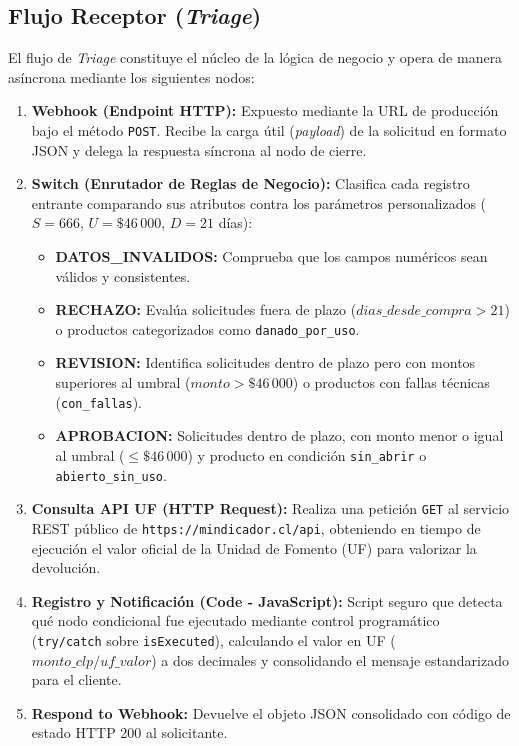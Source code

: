 \documentclass[11pt,letterpaper]{article}
\begin{document}
\subsection{Flujo Receptor (\textit{Triage})}
El flujo de \textit{Triage} constituye el núcleo de la lógica de negocio y opera de manera asíncrona mediante los siguientes nodos:
\begin{enumerate}
    \item \textbf{Webhook (Endpoint HTTP):} Expuesto mediante la URL de producción bajo el método \texttt{POST}. Recibe la carga útil (\textit{payload}) de la solicitud en formato JSON y delega la respuesta síncrona al nodo de cierre.
    \item \textbf{Switch (Enrutador de Reglas de Negocio):} Clasifica cada registro entrante comparando sus atributos contra los parámetros personalizados ($S = 666$, $U = \$46\,000$, $D = 21$ días):
    \begin{itemize}
        \item \textbf{DATOS\_INVALIDOS:} Comprueba que los campos numéricos sean válidos y consistentes.
        \item \textbf{RECHAZO:} Evalúa solicitudes fuera de plazo ($dias\_desde\_compra > 21$) o productos categorizados como \texttt{danado\_por\_uso}.
        \item \textbf{REVISION:} Identifica solicitudes dentro de plazo pero con montos superiores al umbral ($monto > \$46\,000$) o productos con fallas técnicas (\texttt{con\_fallas}).
        \item \textbf{APROBACION:} Solicitudes dentro de plazo, con monto menor o igual al umbral ($\le \$46\,000$) y producto en condición \texttt{sin\_abrir} o \texttt{abierto\_sin\_uso}.
    \end{itemize}
    \item \textbf{Consulta API UF (HTTP Request):} Realiza una petición \texttt{GET} al servicio REST público de \texttt{https://mindicador.cl/api}, obteniendo en tiempo de ejecución el valor oficial de la Unidad de Fomento (UF) para valorizar la devolución.
    \item \textbf{Registro y Notificación (Code - JavaScript):} Script seguro que detecta qué nodo condicional fue ejecutado mediante control programático (\texttt{try/catch} sobre \texttt{isExecuted}), calculando el valor en UF ($monto\_clp / uf\_valor$) a dos decimales y consolidando el mensaje estandarizado para el cliente.
    \item \textbf{Respond to Webhook:} Devuelve el objeto JSON consolidado con código de estado HTTP 200 al solicitante.
\end{enumerate}
\end{document}
